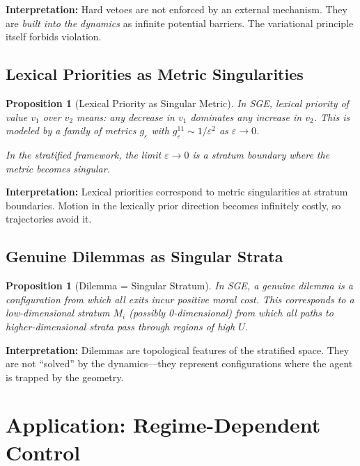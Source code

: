 \documentclass[11pt,a4paper]{article}
\newtheorem{proposition}[theorem]{Proposition}
\begin{document}
\textbf{Interpretation:} Hard vetoes are not enforced by an external mechanism. They are \textit{built into the dynamics} as infinite potential barriers. The variational principle itself forbids violation.

\subsection{Lexical Priorities as Metric Singularities}

\begin{proposition}[Lexical Priority as Singular Metric]
In SGE, lexical priority of value $v_1$ over $v_2$ means: any decrease in $v_1$ dominates any increase in $v_2$. This is modeled by a family of metrics $g_\varepsilon$ with $g_\varepsilon^{11} \sim 1/\varepsilon^2$ as $\varepsilon \to 0$.

In the stratified framework, the limit $\varepsilon \to 0$ is a stratum boundary where the metric becomes singular.
\end{proposition}

\textbf{Interpretation:} Lexical priorities correspond to metric singularities at stratum boundaries. Motion in the lexically prior direction becomes infinitely costly, so trajectories avoid it.

\subsection{Genuine Dilemmas as Singular Strata}

\begin{proposition}[Dilemma = Singular Stratum]
In SGE, a genuine dilemma is a configuration from which all exits incur positive moral cost. This corresponds to a low-dimensional stratum $M_i$ (possibly 0-dimensional) from which all paths to higher-dimensional strata pass through regions of high $U$.
\end{proposition}

\textbf{Interpretation:} Dilemmas are topological features of the stratified space. They are not ``solved'' by the dynamics---they represent configurations where the agent is trapped by the geometry.

\section{Application: Regime-Dependent Control}\label{sec:application}
\end{document}
